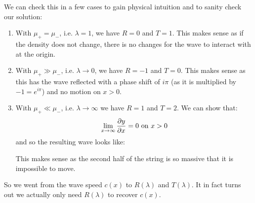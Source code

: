 \documentclass[../main.tex]{subfiles}
\begin{document}
We can check this in a few cases to gain physical intuition and to sanity check our solution:
\begin{enumerate}
  \item With $\mu_{+} = \mu_{-}$, i.e. $\lambda = 1$, we have $R = 0$ and $T = 1$.
    This makes sense as if the density does not change, there is no changes for the wave to interact with at the origin.
  \item With $\mu_{+} \gg \mu_{-}$, i.e. $\lambda \to 0$, we have $R = -1$ and $T = 0$.
    This makes sense as this has the wave reflected with a phase shift of $i \pi$ (as it is multiplied by $-1 = e^{i \pi}$) and no motion on $x > 0$.
    \begin{center}
    \end{center}
  \item With $\mu_{+} \ll \mu_{-}$, i.e. $\lambda \to \infty$ we have $R = 1$ and $T = 2$.
    We can show that:
    \[
      \lim_{x \to \infty} \pderiv{y}{x} = 0 \text{ on } x > 0
    \]
    and so the resulting wave looks like:
    \begin{center}
    \end{center}
    This makes sense as the second half of the string is so massive that it is impossible to move.
\end{enumerate}
\begin{remark}
  So we went from the wave speed $c(x)$ to $R(\lambda)$ and $T(\lambda)$.
  It in fact turns out we actually only need $R(\lambda)$ to recover $c(x)$.
\end{remark}
\end{document}
